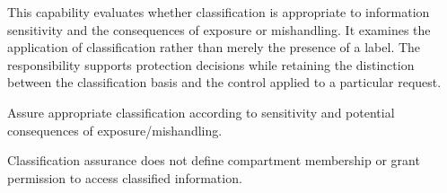 This capability evaluates whether classification is appropriate to information sensitivity and the consequences of exposure or mishandling. It examines the application of classification rather than merely the presence of a label. The responsibility supports protection decisions while retaining the distinction between the classification basis and the control applied to a particular request.



Assure appropriate classification according to sensitivity and potential consequences of exposure/\allowbreak{}mishandling.



Classification assurance does not define compartment membership or grant permission to access classified information.


